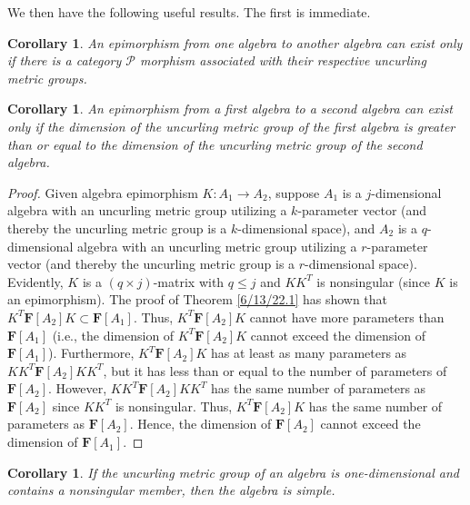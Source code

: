 \documentclass{amsart}
\numberwithin{equation}{section}
\newtheorem{corollary}[theorem]{Corollary}
\theoremstyle{definition}
\numberwithin{theorem}{section}
\begin{document}
We then have the following useful results.  The first is immediate.

\begin{corollary}\label{6/26/22.2} An epimorphism from one algebra to another algebra can exist only if there is a category $\mathcal{P}$ morphism associated with their respective uncurling metric groups. \end{corollary}

\begin{corollary} \label{8/17/22.5} An epimorphism from a first algebra to a second algebra can exist only if the dimension of the uncurling metric group of the first algebra is greater than or equal to the dimension of the uncurling metric group of the second algebra. \end{corollary}  

\begin{proof} Given algebra epimorphism $K:A_1\rightarrow A_2$, suppose $A_1$ is a $j$-dimensional algebra with an uncurling metric group utilizing a $k$-parameter vector (and thereby the uncurling metric group is a $k$-dimensional space), and $A_2$ is a $q$-dimensional algebra with an uncurling metric group utilizing a $r$-parameter vector (and thereby the uncurling metric group is a $r$-dimensional space).  Evidently, $K$ is a $(q\times j)$-matrix with $q\le j$ and $KK^T$ is nonsingular (since $K$ is an epimorphism). The proof of Theorem \ref{6/13/22.1} has shown that $K^T \mathbf{F}[A_2] K \subset \mathbf{F}[A_1]$.  Thus, $K^T \mathbf{F}[A_2] K$ cannot have more parameters than $\mathbf{F}[A_1]$  (i.e., the dimension of $K^T \mathbf{F}[A_2] K$ cannot exceed the dimension of $\mathbf{F}[A_1]$).  Furthermore, $K^T \mathbf{F}[A_2] K$ has at least as many parameters as $KK^T \mathbf{F}[A_2] KK^T$, but it has less than or equal to the number of parameters of $\mathbf{F}[A_2]$.  However, $KK^T \mathbf{F}[A_2] KK^T$ has the same number of parameters as $\mathbf{F}[A_2]$ since $KK^T$ is nonsingular.  Thus, $K^T \mathbf{F}[A_2] K$ has the same number of parameters as $\mathbf{F}[A_2]$.  Hence, the dimension of $\mathbf{F}[A_2]$ cannot exceed the dimension of $\mathbf{F}[A_1]$.
\end{proof}

\begin{corollary}\label{8/17/22.1} If the uncurling metric group of an algebra is one-dimensional and contains a nonsingular member, then the algebra is simple. \end{corollary}
\end{document}
